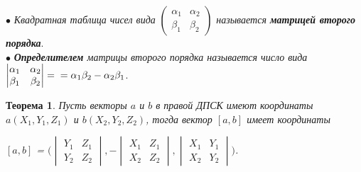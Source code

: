 $\bullet$ \textit{Квадратная таблица чисел вида} $\begin{pmatrix} \alpha_1 & \alpha_2 \\ \beta_1 & \beta_2 \end{pmatrix}$ \textit{называется \textbf{матрицей второго порядка}}. \\
$\bullet$ \textit{\textbf{Определителем} матрицы второго порядка называется число вида} $\begin{vmatrix} \alpha_1 & \alpha_2 \\ \beta_1 & \beta_2 \end{vmatrix} = \\ = \alpha_1\beta_2 - \alpha_2\beta_1$. \\
\newtheorem*{t3_5_1}{Теорема}\begin{t3_5_1} Пусть векторы $a$ и $b$ в правой ДПСК имеют координаты $a (X_1, Y_1, Z_1)$ и $b (X_2, Y_2, Z_2)$, тогда вектор $[a, b]$ имеет координаты\begin{center}
		$[a, b]$ =  $\Bigg( \begin{vmatrix} Y_1 & Z_1 \\ Y_2 & Z_2 \end{vmatrix}, - \begin{vmatrix} X_1 & Z_1 \\ X_2 & Z_2 \end{vmatrix}, \begin{vmatrix} X_1 & Y_1 \\ X_2 & Y_2 \end{vmatrix} \Bigg)$.
	\end{center}
\end{t3_5_1}
